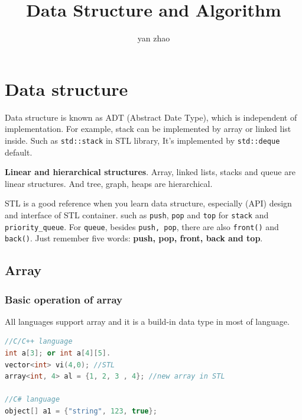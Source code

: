\documentclass[a4paper,11pt,twoside]{book}
\begin{document}
\title{Data Structure and Algorithm}
\author{yan zhao}
\date{}\maketitle

\setcounter{secnumdepth}{4}
\setcounter{tocdepth}{4}
\tableofcontents

\setlength\parindent{0pt}
\setlength{\parskip}{5pt}

\chapter{Data structure} 

	\par Data structure is known as ADT (Abstract Date Type),  which is independent of implementation. For example, stack can be implemented by array or linked list inside. Such as \texttt{std::stack} in STL library, It's implemented by \texttt{std::deque} default.   
	
	\par \textbf{Linear and hierarchical structures}. Array, linked lists, stacks and queue are linear structures. And tree, graph, heaps are hierarchical.
	
	\par STL is a good reference when you learn data structure, especially (API) design and interface of STL container. such as \texttt{push}, \texttt{pop}  and \texttt{top} for \texttt{stack} and \texttt{priority\_queue}. For \texttt{queue}, besides \texttt{push, pop},  there are also \texttt{front()} and \texttt{back()}. Just remember five words: \textbf{push, pop, front, back and top}.
	
\section{Array}

\subsection{Basic operation of array}

	All languages support array and it is a build-in data type in most of language.  
\begin{lstlisting}[frame=single, language=c++]
//C/C++ language
int a[3]; or int a[4][5].  
vector<int> vi(4,0); //STL
array<int, 4> al = {1, 2, 3 , 4}; //new array in STL
  
//C# language 
object[] a1 = {"string", 123, true};
\end{lstlisting}
\end{document}
